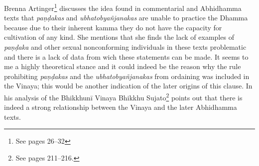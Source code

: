 Brenna Artinger\footnote{See \cite{artinger} pages 26–32} discusses the idea found in commentarial and Abhidhamma texts that {\em paṇḍakas} and {\em ubhatob­yañ­janakas} are unable to practice the Dhamma because due to their inherent kamma they do not have the capacity for cultivation of any kind. She mentions that she finds the lack of examples of {\em paṇḍaka} and other sexual nonconforming individuals in these texts problematic and there is a lack of data from wich these statements can be made. It seems to me a highly theoretical stance and it could indeed be the reason why the rule prohibiting {\em paṇḍakas} and the {\em ubhatob­yañ­janakas} from ordaining was included in the Vinaya; this would be another indication of the later origins of this clause. In his analysis of the Bhikkhunī Vinaya Bhikkhu Sujato\footnote{See \cite{sujato2009} pages 211–216.} points out that there is indeed a strong relationship between the Vinaya and the later Abhidhamma texts.

